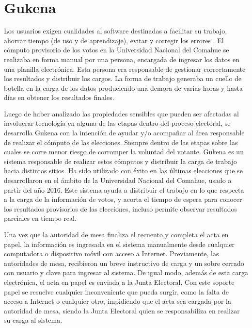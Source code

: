 \label{Gukena}
\chapter{Gukena}
Los usuarios exigen cualidades al software destinadas a facilitar su trabajo, ahorrar tiempo (de uso y de aprendizaje), evitar y corregir los errores \cite{definicionUsuarioInterfaz}. El cómputo provisorio de los votos en la Universidad Nacional del Comahue se realizaba en forma manual por una persona, encargada de ingresar los datos en una planilla electrónica. Esta persona era responsable de gestionar correctamente los resultados y distribuir los cargos. La forma de trabajo generaba un cuello de botella en la carga de los datos produciendo una demora de varias horas y hasta días en obtener los resultados finales.

Luego de haber analizado las propiedades sensibles que pueden ser afectadas al involucrar tecnología en alguna de las etapas dentro del proceso electoral, se desarrolla Gukena con la intención de ayudar y/o 
acompañar al área responsable de realizar el cómputo de las elecciones. Siempre dentro de las etapas sobre las cuales se corre menor riesgo de corromper la voluntad del votante. Gukena es un sistema responsable de realizar estos cómputos y distribuir la carga de trabajo hacia distintos sitios. Ha sido utilizado con éxito en las últimas elecciones que se desarrollaron en el ámbito de la Universidad Nacional del Comahue, usado a partir del año 2016. Este sistema ayuda a distribuir el trabajo en lo que respecta a la carga de la información de votos, y acorta el tiempo de espera para conocer los resultados provisorios de las elecciones, incluso permite observar resultados parciales en tiempo real.\newline

Una vez que la autoridad de mesa finaliza el recuento y completa el acta en papel,  la información es ingresada en el sistema manualmente desde cualquier computadora o dispositivo móvil con acceso a Internet. Previamente, las autoridades de mesa, recibieron un breve instructivo de carga y un sobre cerrado con usuario y clave para ingresar al sistema. De igual modo, además de esta carga electrónica, el acta en papel es enviada a la Junta Electoral. Con este soporte papel se resuelve cualquier inconveniente que pueda surgir, como la falta de acceso a Internet o cualquier otro,  impidiendo que el acta sea cargada por la autoridad de mesa, siendo la Junta Electoral quien se responsabiliza en realizar su carga al sistema.

